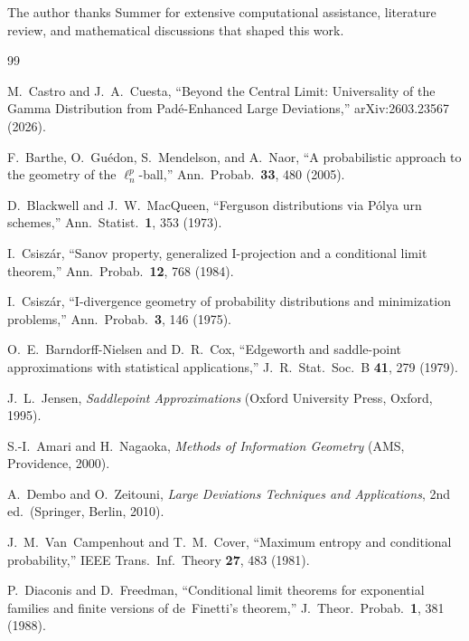 \documentclass[aps,pre,twocolumn,superscriptaddress,nofootinbib]{revtex4-2}
\theoremstyle{definition}
\theoremstyle{remark}
\begin{document}
\begin{acknowledgments}
The author thanks Summer for extensive computational assistance, literature
review, and mathematical discussions that shaped this work.
\end{acknowledgments}

\begin{thebibliography}{99}

M.~Castro and J.~A.~Cuesta, ``Beyond the Central Limit: Universality of the
Gamma Distribution from Pad\'{e}-Enhanced Large Deviations,'' arXiv:2603.23567
(2026).

F.~Barthe, O.~Gu\'{e}don, S.~Mendelson, and A.~Naor, ``A probabilistic
approach to the geometry of the $\ell^p_n$-ball,'' Ann.\ Probab.\ \textbf{33},
480 (2005).

D.~Blackwell and J.~W.~MacQueen, ``Ferguson distributions via P\'{o}lya urn
schemes,'' Ann.\ Statist.\ \textbf{1}, 353 (1973).

I.~Csisz\'{a}r, ``Sanov property, generalized I-projection and a conditional
limit theorem,'' Ann.\ Probab.\ \textbf{12}, 768 (1984).

I.~Csisz\'{a}r, ``I-divergence geometry of probability distributions and
minimization problems,'' Ann.\ Probab.\ \textbf{3}, 146 (1975).

O.~E.~Barndorff-Nielsen and D.~R.~Cox, ``Edgeworth and saddle-point
approximations with statistical applications,'' J.\ R.\ Stat.\ Soc.\ B
\textbf{41}, 279 (1979).

J.~L.~Jensen, \emph{Saddlepoint Approximations} (Oxford University Press,
Oxford, 1995).

S.-I.~Amari and H.~Nagaoka, \emph{Methods of Information Geometry} (AMS,
Providence, 2000).

A.~Dembo and O.~Zeitouni, \emph{Large Deviations Techniques and Applications},
2nd ed.\ (Springer, Berlin, 2010).

J.~M.~Van~Campenhout and T.~M.~Cover, ``Maximum entropy and conditional
probability,'' IEEE Trans.\ Inf.\ Theory \textbf{27}, 483 (1981).

P.~Diaconis and D.~Freedman, ``Conditional limit theorems for exponential
families and finite versions of de~Finetti's theorem,'' J.\ Theor.\ Probab.\
\textbf{1}, 381 (1988).


\end{thebibliography}
\end{document}
